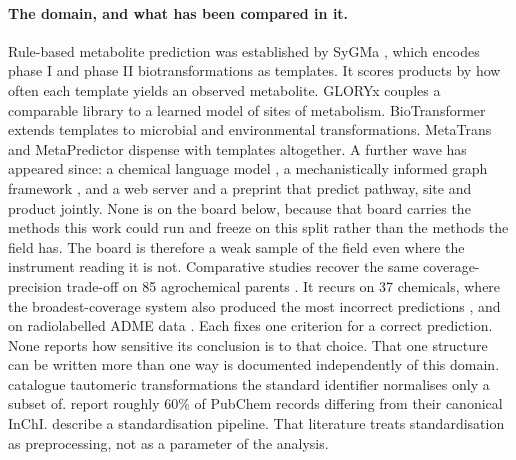 \documentclass{article}
\begin{document}
\paragraph{The domain, and what has been compared in it.} Rule-based metabolite prediction was
established by SyGMa \citep{Ridder_2008}, which encodes phase I and phase II biotransformations as
templates. It scores products by how often each template yields an observed metabolite. GLORYx
\citep{de_Bruyn_Kops_2020} couples a comparable library to a learned model of sites of metabolism.
BioTransformer \citep{Djoumbou_Feunang_2019} extends templates to microbial and environmental
transformations. MetaTrans \citep{Litsa_2020} and MetaPredictor \citep{Zhu_2024} dispense with
templates altogether. A further wave has appeared since: a chemical language model
\citep{Larsson_2025}, a mechanistically informed graph framework \citep{Zhou_2025}, and a web server
\citep{Zhou_2026} and a preprint \citep{Chavan_2026} that predict pathway, site and product jointly. None is on the board below, because that board carries the methods this work
could run and freeze on this split rather than the methods the field has. The board is therefore a
weak sample of the field even where the instrument reading it is not. Comparative studies recover
the same coverage-precision trade-off on 85 agrochemical parents \citep{Scholz_2023}. It recurs on
37 chemicals, where the broadest-coverage system also produced the most incorrect predictions
\citep{Boyce_2022}, and on radiolabelled ADME data \citep{Gao_2026}. Each fixes one criterion for a
correct prediction. None reports how sensitive its conclusion is to that choice. That one structure
can be written more than one way is documented independently of this domain. \citet{Dhaked_2020}
catalogue tautomeric transformations the standard identifier normalises only a subset of.
\citet{Hahnke_2018} report roughly $60\%$ of PubChem records differing from their canonical InChI.
\citet{Mansouri_2024} describe a standardisation pipeline. That literature treats standardisation as
preprocessing, not as a parameter of the analysis.

\end{document}
